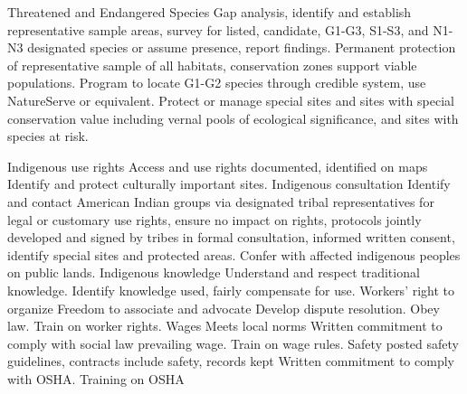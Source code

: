 \documentclass[]{article}
\begin{document}
\textbar{}Threatened and Endangered Species \textbar{} Gap analysis,
identify and establish representative sample areas, survey for listed,
candidate, G1-G3, S1-S3, and N1-N3 designated species or assume
presence, report findings. Permanent protection of representative sample
of all habitats, conservation zones support viable populations.
\textbar{} Program to locate G1-G2 species through credible system, use
NatureServe or equivalent. Protect or manage special sites and sites
with special conservation value including vernal pools of ecological
significance, and sites with species at risk. \textbar{}

\textbar{}Indigenous use rights \textbar{} Access and use rights
documented, identified on maps \textbar{} Identify and protect
culturally important sites. \textbar{} \textbar{}Indigenous consultation
\textbar{} Identify and contact American Indian groups via designated
tribal representatives for legal or customary use rights, ensure no
impact on rights, protocols jointly developed and signed by tribes in
formal consultation, informed written consent, identify special sites
and protected areas. \textbar{} Confer with affected indigenous peoples
on public lands. \textbar{}Indigenous knowledge \textbar{} Understand
and respect traditional knowledge. \textbar{} Identify knowledge used,
fairly compensate for use. \textbar{} \textbar{}Workers' right to
organize \textbar{} Freedom to associate and advocate \textbar{} Develop
dispute resolution. \textbar{} Obey law. Train on worker rights.
\textbar{} \textbar{}Wages \textbar{} Meets local norms \textbar{}
Written commitment to comply with social law prevailing wage. Train on
wage rules. \textbar{} \textbar{}Safety \textbar{} posted safety
guidelines, contracts include safety, records kept \textbar{} Written
commitment to comply with OSHA. Training on OSHA \textbar{}
\end{document}
